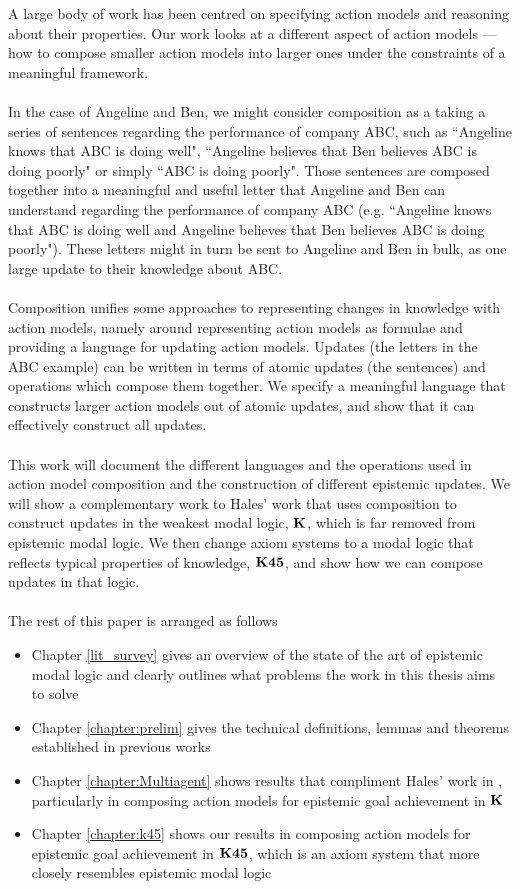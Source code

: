 A large body of work has been centred on specifying action models and reasoning
about their properties.
Our work looks at a different aspect of action models --- how to compose smaller action models
into larger ones under the constraints of a meaningful framework.\\
\\
In the case of Angeline and Ben, we might consider composition as a taking a series of sentences
regarding the performance of company ABC, such as ``Angeline knows that ABC is doing well", ``Angeline
believes that Ben believes ABC is doing poorly" or simply ``ABC is doing poorly".
Those sentences are composed together into a meaningful and useful letter that Angeline and Ben can
understand regarding the performance of company ABC (e.g. ``Angeline knows that ABC is doing well
and Angeline believes that Ben believes ABC is doing poorly").
These letters might in turn be sent to Angeline and Ben in bulk, as one large update to their knowledge
about ABC.\\
\\
Composition unifies some approaches to representing changes in knowledge with action models, namely
around representing action models as formulae and providing a language for updating action models.
Updates (the letters in the ABC example) can be written in terms of atomic updates (the sentences)
and operations which compose them together.
We specify a meaningful language that constructs larger action models out of atomic updates, and
show that it can effectively construct all updates.\\
\\
This work will document the different languages and the operations used in action model composition
and the construction of different epistemic updates.
We will show a complementary work to Hales' \cite{hales13synthesis} work that uses composition to
construct updates in the weakest modal logic,
$\bf K$, which is far removed from epistemic modal logic.
We then change axiom systems to a modal logic that reflects typical properties of knowledge,
$\bf K45$, and show how we can compose updates in that logic.\\
\\
The rest of this paper is arranged as follows
\begin{itemize}
	\item Chapter \ref{lit_survey} gives an overview of the state of the art of epistemic modal logic
		and clearly outlines what problems the work in this thesis aims to solve
	\item Chapter \ref{chapter:prelim} gives the technical definitions, lemmas and theorems
		established in previous works
	\item Chapter \ref{chapter:Multiagent} shows results that compliment Hales' work in
		\cite{hales13synthesis}, particularly in composing action models for epistemic goal
		achievement in $\bf K$
	\item Chapter \ref{chapter:k45} shows our results in composing action models for epistemic goal
		achievement in $\bf K45$, which is an axiom system that more closely resembles epistemic modal
		logic
\end{itemize}

